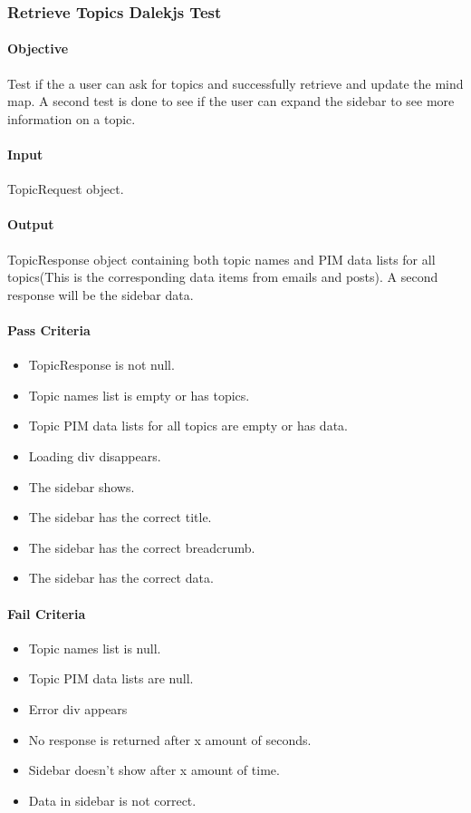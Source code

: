 \documentclass[hidelinks,english]{article}
\begin{document}
			\subsubsection{Retrieve Topics Dalekjs Test}\label{frontendretrievetopicsdalekjstest}
    			\paragraph{Objective} Test if the a user can ask for topics and successfully retrieve and update the mind map. A second test is done to see if the user can expand the sidebar to see more information on a topic.
    			\paragraph{Input} TopicRequest object.
    			\paragraph{Output} TopicResponse object containing both topic names and PIM data lists for all topics(This is the corresponding data items from emails and posts). A second response will be the sidebar data.
			    \paragraph{Pass Criteria}
			    \begin{itemize}
			        \item TopicResponse is not null.
			        \item Topic names list is empty or has topics.
			        \item Topic PIM data lists for all topics are empty or has data.
			        \item Loading div disappears.
			        \item The sidebar shows.
			        \item The sidebar has the correct title.
			        \item The sidebar has the correct breadcrumb.
			        \item The sidebar has the correct data.
			        
			    \end{itemize}
			     \paragraph{Fail Criteria}
			    \begin{itemize}
			        \item Topic names list is null.
			        \item Topic PIM data lists are null.
			        \item Error div appears
			        \item No response is returned after x amount of seconds.
			        \item Sidebar doesn't show after x amount of time.
			        \item Data in sidebar is not correct.
			    \end{itemize}
			
\end{document}
